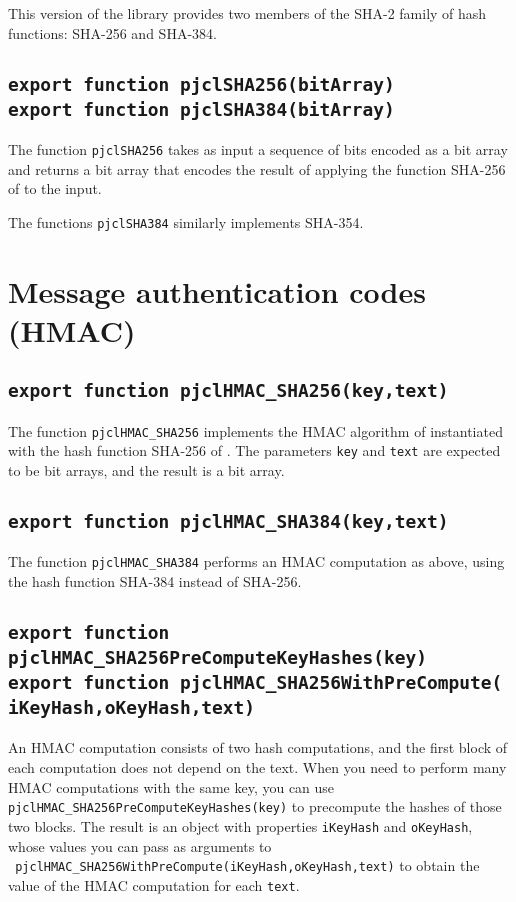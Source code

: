 \documentclass[12pt]{article}
\begin{document}
This version of the library provides two members of the SHA-2 family
of hash functions: SHA-256 and SHA-384.

\subsection{\tt export function pjclSHA256(bitArray)\\export function pjclSHA384(bitArray)}

The function {\tt pjclSHA256} takes as input a sequence of bits
encoded as a bit array and returns a bit array that encodes the result
of applying the function SHA-256 of \cite{FIPS180-4} to the input.

The functions {\tt pjclSHA384} similarly implements SHA-354.

\section{Message authentication codes (HMAC)}

\subsection{\tt export function pjclHMAC\_SHA256(key,text)}

The function {\tt pjclHMAC\_SHA256} implements the HMAC algorithm of
\cite{FIPS198-1} instantiated with the hash function SHA-256 of
\cite{FIPS180-4}.  The parameters {\tt key} and {\tt text} are
expected to be bit arrays, and the result is a bit array.

\subsection{\tt export function pjclHMAC\_SHA384(key,text)}

The function {\tt pjclHMAC\_SHA384} performs an HMAC computation as above, 
using the hash function SHA-384 instead of SHA-256.

\subsection{\tt export function pjclHMAC\_SHA256PreComputeKeyHashes(key)\\export function pjclHMAC\_SHA256WithPreCompute(\\\mbox{}\hspace{.2in}iKeyHash,oKeyHash,text)}

An HMAC computation consists of two hash computations, and the first
block of each computation does not depend on the text.  When you need
to perform many HMAC computations with the same key, you can use
{\tt pjclHMAC\_SHA256PreComputeKeyHashes(key)} to precompute the hashes
of those two blocks.  The result is an object with properties {\tt iKeyHash}
and {\tt oKeyHash}, whose values you can pass as arguments to\\{\tt
  pjclHMAC\_SHA256WithPreCompute(iKeyHash,oKeyHash,text)} to obtain the
value of the HMAC computation for each {\tt text}.
\end{document}
